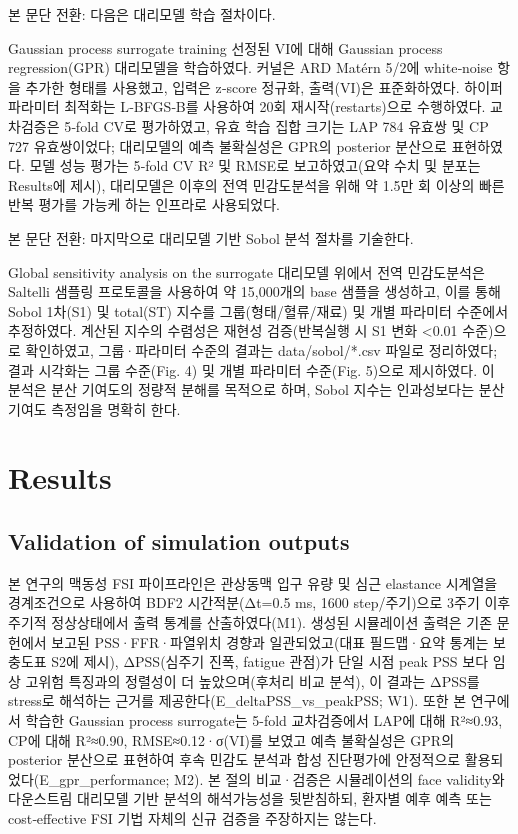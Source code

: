 \documentclass[preprint,12pt]{elsarticle}
\begin{document}
본 문단 전환: 다음은 대리모델 학습 절차이다.

Gaussian process surrogate training
선정된 VI에 대해 Gaussian process regression(GPR) 대리모델을 학습하였다. 커널은 ARD Matérn 5/2에 white‑noise 항을 추가한 형태를 사용했고, 입력은 z‑score 정규화, 출력(VI)은 표준화하였다. 하이퍼파라미터 최적화는 L‑BFGS‑B를 사용하여 20회 재시작(restarts)으로 수행하였다. 교차검증은 5‑fold CV로 평가하였고, 유효 학습 집합 크기는 LAP 784 유효쌍 및 CP 727 유효쌍이었다; 대리모델의 예측 불확실성은 GPR의 posterior 분산으로 표현하였다. 모델 성능 평가는 5‑fold CV R² 및 RMSE로 보고하였고(요약 수치 및 분포는 Results에 제시), 대리모델은 이후의 전역 민감도분석을 위해 약 1.5만 회 이상의 빠른 반복 평가를 가능케 하는 인프라로 사용되었다.

본 문단 전환: 마지막으로 대리모델 기반 Sobol 분석 절차를 기술한다.

Global sensitivity analysis on the surrogate
대리모델 위에서 전역 민감도분석은 Saltelli 샘플링 프로토콜을 사용하여 약 15,000개의 base 샘플을 생성하고, 이를 통해 Sobol 1차(S1) 및 total(ST) 지수를 그룹(형태/혈류/재료) 및 개별 파라미터 수준에서 추정하였다. 계산된 지수의 수렴성은 재현성 검증(반복실행 시 S1 변화 <0.01 수준)으로 확인하였고, 그룹·파라미터 수준의 결과는 data/sobol/*.csv 파일로 정리하였다; 결과 시각화는 그룹 수준(Fig. 4) 및 개별 파라미터 수준(Fig. 5)으로 제시하였다. 이 분석은 분산 기여도의 정량적 분해를 목적으로 하며, Sobol 지수는 인과성보다는 분산 기여도 측정임을 명확히 한다.

\section{Results}

\subsection{Validation of simulation outputs}
본 연구의 맥동성 FSI 파이프라인은 관상동맥 입구 유량 및 심근 elastance 시계열을 경계조건으로 사용하여 BDF2 시간적분(Δt=0.5 ms, 1600 step/주기)으로 3주기 이후 주기적 정상상태에서 출력 통계를 산출하였다(M1). 생성된 시뮬레이션 출력은 기존 문헌에서 보고된 PSS·FFR·파열위치 경향과 일관되었고(대표 필드맵·요약 통계는 보충도표 S2에 제시), ΔPSS(심주기 진폭, fatigue 관점)가 단일 시점 peak PSS 보다 임상 고위험 특징과의 정렬성이 더 높았으며(후처리 비교 분석), 이 결과는 ΔPSS를 stress로 해석하는 근거를 제공한다(E\_deltaPSS\_vs\_peakPSS; W1). 또한 본 연구에서 학습한 Gaussian process surrogate는 5-fold 교차검증에서 LAP에 대해 R²≈0.93, CP에 대해 R²≈0.90, RMSE≈0.12·σ(VI)를 보였고 예측 불확실성은 GPR의 posterior 분산으로 표현하여 후속 민감도 분석과 합성 진단평가에 안정적으로 활용되었다(E\_gpr\_performance; M2). 본 절의 비교·검증은 시뮬레이션의 face validity와 다운스트림 대리모델 기반 분석의 해석가능성을 뒷받침하되, 환자별 예후 예측 또는 cost‑effective FSI 기법 자체의 신규 검증을 주장하지는 않는다.
\end{document}
